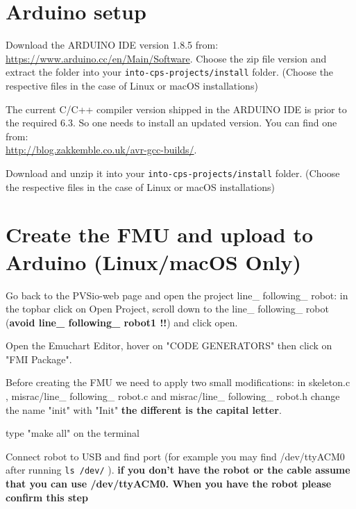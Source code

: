 \documentclass[11pt,a4paper]{../tutorial}
\begin{document}
\section{Arduino setup}
\begin{instructions}
\item Download the ARDUINO IDE version 1.8.5 from:\\
	\url{https://www.arduino.cc/en/Main/Software}.  Choose the zip file
	version and extract the folder into your
	\texttt{into-cps-projects/install} folder. (Choose the respective files in the case of Linux or macOS installations)

\item The current C/C++ compiler version shipped in the ARDUINO IDE is prior to the required 6.3. So one needs to install an updated version. You can find one from:\\
	\url{http://blog.zakkemble.co.uk/avr-gcc-builds/}.

	Download and unzip it into your  \texttt{into-cps-projects/install} folder. (Choose the respective files in the case of Linux or macOS installations)

\section{Create the FMU and upload to Arduino (Linux/macOS Only)}


\item Go back to the PVSio-web page and open the project line\_ following\_ robot: in the topbar click on Open Project, scroll down to the line\_ following\_ robot (\textbf{avoid line\_ following\_ robot1 !!}) and click open.
\item Open the Emuchart Editor, hover on "CODE GENERATORS" then click on "FMI Package".
\item Before creating the FMU we need to apply two small modifications:
 in skeleton.c , misrac/line\_ following\_ robot.c and  misrac/line\_ following\_ robot.h change the name "init" with "Init" \textbf{the different is the capital letter}.
\item type "make all" on the terminal

\item Connect robot to USB and find port (for example you may find /dev/ttyACM0 after running \verb'ls /dev/' ). \textbf{if you don't have the robot or the cable assume that you can use /dev/ttyACM0. When you have the robot please confirm this step}







\end{instructions}
\end{document}
